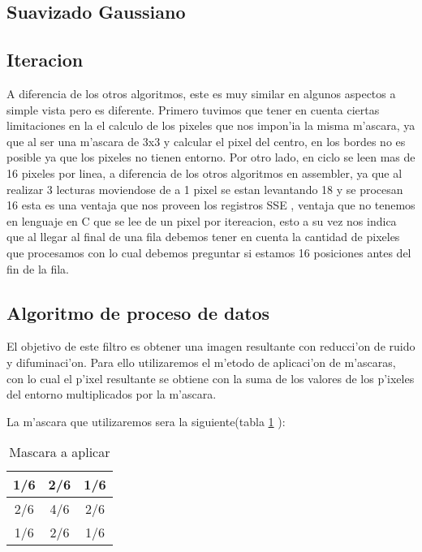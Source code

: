 \subsection{Suavizado Gaussiano}

\subsection{Iteracion}
A diferencia de los otros algoritmos, este es muy similar en algunos aspectos a simple vista pero es diferente.
Primero tuvimos que tener en cuenta ciertas limitaciones en la el calculo de los pixeles que nos impon'ia la misma m'ascara, ya que al ser una m'ascara de 3x3 y calcular el pixel del centro, en los bordes no es posible ya que los pixeles no tienen entorno.
Por otro lado, en ciclo se leen mas de 16 pixeles por linea, a diferencia de los otros algoritmos en assembler, ya que al realizar 3 lecturas moviendose de a 1 pixel se estan levantando 18 y se procesan 16 esta es una ventaja que nos proveen los registros SSE , ventaja que no tenemos en lenguaje en C que se lee de un pixel por itereacion, esto a su vez nos indica que al llegar al final de una fila debemos tener en cuenta la cantidad de pixeles que procesamos con lo cual debemos preguntar si estamos 16 posiciones antes del fin de la fila.

\subsection{Algoritmo de proceso de datos}
El objetivo de este filtro es obtener una imagen resultante con reducci'on de ruido y difuminaci'on. 
Para ello utilizaremos el m'etodo de aplicaci'on de m'ascaras, con lo cual el p'ixel resultante se obtiene con la suma
de los valores de los p'ixeles del entorno multiplicados por la m'ascara.

La m'ascara que utilizaremos sera la siguiente(tabla \ref{tab:s-uno} ):

\begin{table}[h!]
\begin{center}
\begin{tabular}{| c | c | c |}
\hline
1/6 & 2/6 & 1/6 \\ \hline
2/6 & 4/6 & 2/6 \\ \hline
1/6 & 2/6 & 1/6 \\ \hline
\end{tabular}
\end{center}
\caption{Mascara a aplicar}
\label{tab:s-uno}
\end{table}

